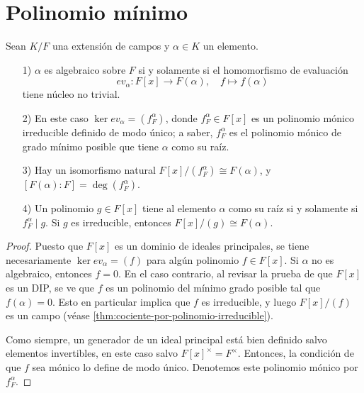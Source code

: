 
\section{Polinomio mínimo}

\begin{teorema}
  \label{thm:polinomio-minimo}
  Sean $K/F$ una extensión de campos y $\alpha \in K$ un elemento.

  \begin{enumerate}
  \item[1)] $\alpha$ es algebraico sobre $F$ si y solamente si el homomorfismo
    de evaluación
    $$ev_\alpha\colon F [x] \to F (\alpha), \quad f \mapsto f (\alpha)$$
    tiene núcleo no trivial.

  \item[2)] En este caso $\ker ev_\alpha = (f^\alpha_F)$, donde
    $f^\alpha_F \in F [x]$ es un polinomio mónico irreducible definido de modo
    único; a saber, $f^\alpha_F$ es el polinomio mónico de grado mínimo posible
    que tiene $\alpha$ como su raíz.

  \item[3)] Hay un isomorfismo natural $F [x] / (f^\alpha_F) \cong F (\alpha)$,
    y $[F (\alpha) : F] = \deg (f^\alpha_F)$.

  \item[4)] Un polinomio $g \in F [x]$ tiene al elemento $\alpha$ como su raíz
    si y solamente si $f^\alpha_F \mid g$. Si $g$ es irreducible, entonces
    $F [x] / (g) \cong F (\alpha)$.
  \end{enumerate}

  \begin{proof}
    Puesto que $F [x]$ es un dominio de ideales principales, se tiene
    necesariamente $\ker ev_\alpha = (f)$ para algún polinomio $f \in F [x]$.
    Si $\alpha$ no es algebraico, entonces $f = 0$. En el caso contrario,
    al revisar la prueba de que $F [x]$ es un DIP, se ve que $f$ es un polinomio
    del mínimo grado posible tal que $f (\alpha) = 0$. Esto en particular
    implica que $f$ es irreducible, y luego $F [x]/(f)$ es un campo
    (véase \ref{thm:cociente-por-polinomio-irreducible}).

    Como siempre, un generador de un ideal principal está bien definido salvo
    elementos invertibles, en este caso salvo $F [x]^\times = F^\times$.
    Entonces, la condición de que $f$ sea mónico lo define de modo
    único. Denotemos este polinomio mónico por $f^\alpha_F$.


\end{proof}
\end{teorema}
